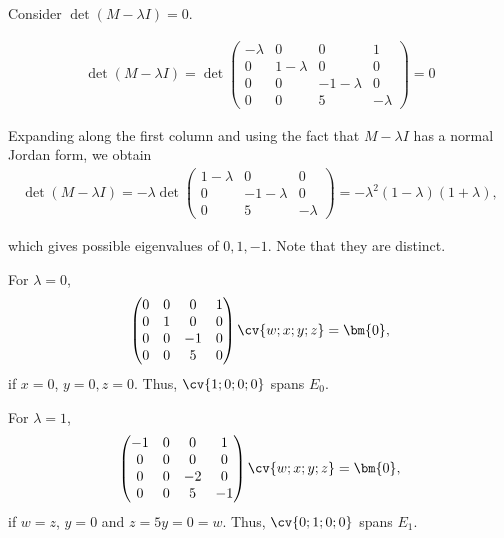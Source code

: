 \documentclass[11pt]{scrartcl}
\begin{document}
\begin{linenumbers}
\begin{soln}
    Consider $\det(M-\lambda I) = 0$.

    \begin{align}
      \det(M-\lambda I) =
      \det\begin{pmatrix}
        -\lambda & 0 & 0  & 1 \\
        0 & 1-\lambda & 0  & 0 \\
        0 & 0 & -1-\lambda & 0\\
        0 & 0 & 5 & -\lambda
      \end{pmatrix} = 0
    \end{align}

    Expanding along the first column and using the fact that
    $M-\lambda I$ has a normal Jordan form, we obtain
    \begin{align}
      \det(M-\lambda I) =
      -\lambda\det\begin{pmatrix}
        1-\lambda & 0          & 0 \\
        0         & -1-\lambda & 0 \\
        0         & 5          & -\lambda
      \end{pmatrix} = -\lambda^{2}(1-\lambda)(1+\lambda),
    \end{align}


    which gives possible eigenvalues of $0, 1, -1$. Note that they are
    distinct.

    For $\lambda=0$,
    \begin{align}
      \begin{pmatrix}
        0 & 0 & 0  & 1 \\
        0 & 1 & 0  & 0 \\
        0 & 0 & -1 & 0 \\
        0 & 0 & 5 & 0
      \end{pmatrix}\cv{w;x;y;z} = \bm{0},
    \end{align}
    if $x=0$, $y=0,z=0$. Thus, $\cv{1;0;0;0}$ spans $E_{0}$.

    For $\lambda = 1$,
    \begin{align}
      \begin{pmatrix}
        -1 & 0 & 0  & 1 \\
        0  & 0 & 0  & 0 \\
        0  & 0 & -2 & 0 \\
        0  & 0 & 5  & -1
      \end{pmatrix}\cv{w;x;y;z} = \bm{0},
    \end{align}
    if $w = z$, $y=0$ and $z = 5y = 0 = w$. Thus, $\cv{0;1;0;0}$ spans $E_{1}$.


\end{soln}
\end{linenumbers}
\end{document}
